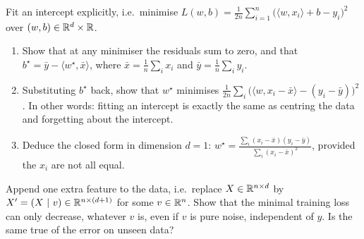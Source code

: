\begin{exercise}[$\star$]
Fit an intercept explicitly, i.e.\ minimise $L(w, b) = \frac{1}{2n}\sum_{i=1}^n
\big( \langle w, x_i \rangle + b - y_i \big)^2$ over $(w, b) \in \mathbb{R}^d \times \mathbb{R}$.
\begin{enumerate}
    \item Show that at any minimiser the residuals sum to zero, and that $b^\star =
    \bar y - \langle w^\star, \bar x \rangle$, where $\bar x = \frac1n \sum_i x_i$ and
    $\bar y = \frac1n \sum_i y_i$.
    \item Substituting $b^\star$ back, show that $w^\star$ minimises $\frac{1}{2n}
    \sum_i \big( \langle w, x_i - \bar x \rangle - (y_i - \bar y) \big)^2$. In other
    words: fitting an intercept is exactly the same as centring the data and
    forgetting about the intercept.
    \item Deduce the closed form in dimension $d = 1$: $w^\star = \frac{\sum_i (x_i -
    \bar x)(y_i - \bar y)}{\sum_i (x_i - \bar x)^2}$, provided the $x_i$ are not all
    equal.
\end{enumerate}
\end{exercise}

\begin{exercise}[$\star$]
Append one extra feature to the data, i.e.\ replace $X \in \mathbb{R}^{n \times d}$ by $X' =
(X \ \vert \ v) \in \mathbb{R}^{n \times (d+1)}$ for some $v \in \mathbb{R}^n$. Show that the
minimal training loss can only decrease, whatever $v$ is, even if $v$ is pure
noise, independent of $y$. Is the same true of the error on unseen data? 
\end{exercise}



